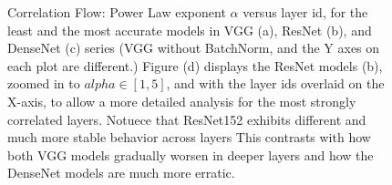 \begin{figure}[t]
    \centering

    \caption{Correlation Flow: Power Law exponent $\alpha$ versus layer id, for the least and the most accurate
      models in VGG (a), ResNet (b), and DenseNet (c) series (VGG without BatchNorm, and the Y axes on each plot are different.)  
             Figure (d) displays the ResNet models (b), zoomed in to $alpha\in[1,5]$, and with the layer ids overlaid on the X-axis, to
             allow a more detailed analysis for the most strongly correlated layers.
             Notuece that ResNet152 exhibits different and much more stable behavior across layers
             This contrasts with how both VGG models gradually worsen in deeper layers and how the DenseNet models are much more erratic.  
            }
    \label{fig:3models-alpha-layers}
\end{figure}

